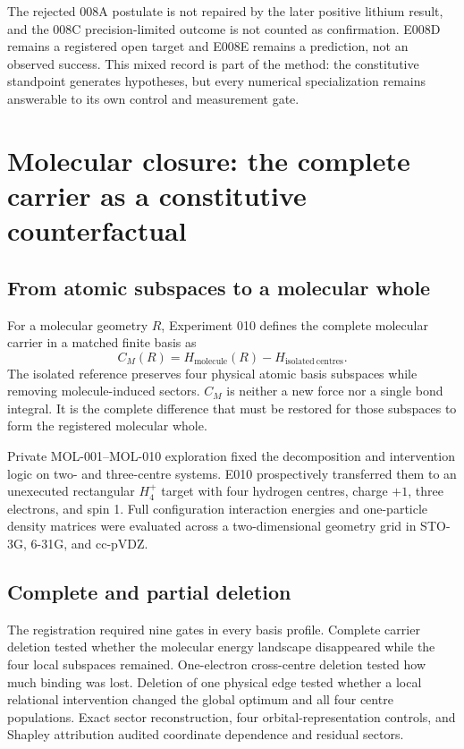 \documentclass[11pt,a4paper]{article}
\begin{document}
The rejected 008A postulate is not repaired by the later positive lithium result, and the 008C precision-limited outcome is not counted as confirmation. E008D remains a registered open target and E008E remains a prediction, not an observed success. This mixed record is part of the method: the constitutive standpoint generates hypotheses, but every numerical specialization remains answerable to its own control and measurement gate.

\section{Molecular closure: the complete carrier as a constitutive counterfactual}

\subsection{From atomic subspaces to a molecular whole}

For a molecular geometry $R$, Experiment 010 defines the complete molecular carrier in a matched finite basis as
\begin{equation}
 C_M(R)=H_{\mathrm{molecule}}(R)-H_{\mathrm{isolated\ centres}}.
 \label{eq:molecular-carrier}
\end{equation}
The isolated reference preserves four physical atomic basis subspaces while removing molecule-induced sectors. $C_M$ is neither a new force nor a single bond integral. It is the complete difference that must be restored for those subspaces to form the registered molecular whole.

Private MOL-001--MOL-010 exploration fixed the decomposition and intervention logic on two- and three-centre systems. E010 prospectively transferred them to an unexecuted rectangular $H_4^+$ target with four hydrogen centres, charge $+1$, three electrons, and spin 1. Full configuration interaction energies and one-particle density matrices were evaluated across a two-dimensional geometry grid in STO-3G, 6-31G, and cc-pVDZ.

\subsection{Complete and partial deletion}

The registration required nine gates in every basis profile. Complete carrier deletion tested whether the molecular energy landscape disappeared while the four local subspaces remained. One-electron cross-centre deletion tested how much binding was lost. Deletion of one physical edge tested whether a local relational intervention changed the global optimum and all four centre populations. Exact sector reconstruction, four orbital-representation controls, and Shapley attribution audited coordinate dependence and residual sectors.
\end{document}
